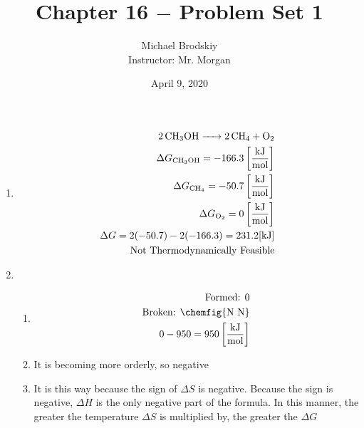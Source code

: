 \documentclass[12pt]{article}
\title{Chapter 16 $-$ Problem Set 1}
\date{April 9, 2020}
\author{Michael Brodskiy\\ \small Instructor: Mr. Morgan}
\begin{document}
\maketitle

\begin{enumerate}

  \item 

    \begin{equation}
      \begin{split}
        \ce{2CH3OH -> 2CH4 + O2}\\
        \Delta G_{\ce{CH3OH}} =-166.3\left[ \frac{\si{\kilo\joule}}{\si{\mole}} \right]\\
        \Delta G_{\ce{CH4}} =-50.7\left[ \frac{\si{\kilo\joule}}{\si{\mole}} \right]\\
        \Delta G_{\ce{O2}} =0\left[ \frac{\si{\kilo\joule}}{\si{\mole}} \right]\\
        \Delta G=2(-50.7)-2(-166.3)=231.2[\si{\kilo\joule}]\\
        \text{Not Thermodynamically Feasible}
      \end{split}
      \label{1}
    \end{equation}

  \item

    \begin{enumerate}

      \item 

        \begin{equation}
          \begin{split}
            \text{Formed: }0\\
            \text{Broken: }\chemfig{\ce{N}~\ce{N}}\\
            0-950=950\left[ \frac{\si{\kilo\joule}}{\si{\mole}} \right]\\
          \end{split}
          \label{2}
        \end{equation}

      \item It is becoming more orderly, so negative

      \item It is this way because the sign of $\Delta S$ is negative. Because the sign is negative, $\Delta H$ is the only negative part of the formula. In this manner, the greater the temperature $\Delta S$ is multiplied by, the greater the $\Delta G$


\end{enumerate}
\end{enumerate}
\end{document}
